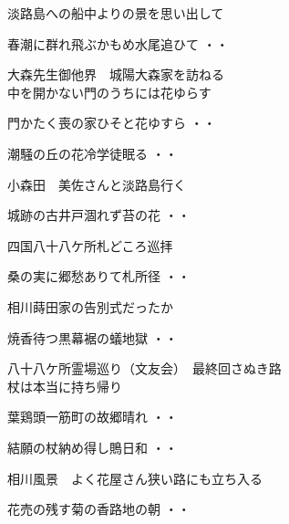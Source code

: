 \vspace{0.6cm}
淡路島への船中よりの景を思い出して
\begin{shiika}春潮に群れ飛ぶかもめ水尾追ひて
\hfill{・・}\end{shiika}
\vspace{0.6cm}
大森先生御他界　城陽大森家を訪ねる
\\中を開かない門のうちには花ゆらす
\vspace{0.6cm}
\begin{shiika}門かたく喪の家ひそと花ゆすら
\hfill{・・}\end{shiika}
\vspace{0.6cm}
\begin{shiika}潮騒の丘の花冷学徒眠る
\hfill{・・}\end{shiika}
\vspace{0.6cm}
小森田　美佐さんと淡路島行く
\begin{shiika}城跡の古井戸涸れず苔の花
\hfill{・・}\end{shiika}
\vspace{0.6cm}
四国八十八ケ所札どころ巡拝
\begin{shiika}桑の実に郷愁ありて札所径
\hfill{・・}\end{shiika}
\vspace{0.6cm}
相川蒔田家の告別式だったか
\begin{shiika}焼香待つ黒幕裾の蟻地獄
\hfill{・・}\end{shiika}
\vspace{0.6cm}
八十八ケ所霊場巡り（文友会）　最終回さぬき路\\杖は本当に持ち帰り
\begin{shiika}葉鶏頭一筋町の故郷晴れ
\hfill{・・}\end{shiika}
\begin{shiika}結願の杖納め得し鵙日和
\hfill{・・}\end{shiika}
\vspace{0.6cm}
相川風景　よく花屋さん狭い路にも立ち入る
\begin{shiika}花売の残す菊の香路地の朝
\hfill{・・}\end{shiika}
\vspace{0.6cm}
